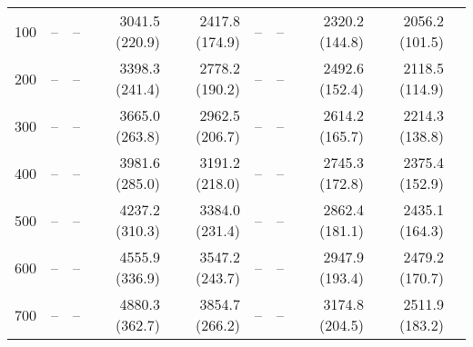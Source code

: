 \documentclass[utf8]{frontiersSCNS} %
\begin{document}
\begin{table*}[htp]
{\begin{tabular}{|r|r|r|r|r|r|r|r|r|r|}
    100& --               & --             & 3041.5 (220.9) & 2417.8 (174.9) &  --              &  --            & 2320.2 (144.8) & 2056.2 (101.5)\\
    200& --               & --             & 3398.3 (241.4) & 2778.2 (190.2) &  --              &  --            & 2492.6 (152.4) & 2118.5 (114.9) \\
    300& --               & --             & 3665.0 (263.8) & 2962.5 (206.7) &  --              &  --            & 2614.2 (165.7) & 2214.3 (138.8) \\
    400& --               & --             & 3981.6 (285.0) & 3191.2 (218.0) &  --              &  --            & 2745.3 (172.8) & 2375.4 (152.9) \\
    500& --               & --             & 4237.2 (310.3) & 3384.0 (231.4) &  --              &  --            & 2862.4 (181.1) & 2435.1 (164.3) \\
    600& --               & --             & 4555.9 (336.9) & 3547.2 (243.7) &  --              &  --            & 2947.9 (193.4) & 2479.2 (170.7)\\
    700& --               & --             & 4880.3 (362.7) & 3854.7 (266.2) &  --              &  --            & 3174.8 (204.5) & 2511.9 (183.2)\\
    \hline
  \end{tabular}
  }
\end{table*}
\end{document}
